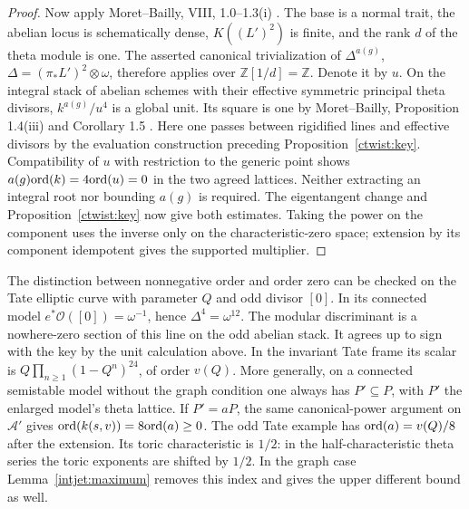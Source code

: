\begin{proof}
Now apply Moret--Bailly, VIII, 1.0--1.3(i)
\cite{moret-bailly-pinceaux}. The base is a normal trait, the
abelian locus is schematically dense, \(K((L')^2)\) is finite,
and the rank \(d\) of the theta module is one. The asserted
canonical trivialization of \(\Delta^{a(g)}\),
\(\Delta=(\pi_*L')^2\otimes\omega\), therefore applies over
\(\mathbb Z[1/d]=\mathbb Z\). Denote it by \(u\). On the integral
stack of abelian schemes with their effective symmetric principal
theta divisors, \(k^{a(g)}/u^4\) is a global unit. Its square is
one by Moret--Bailly, Proposition 1.4(iii) and Corollary 1.5
\cite{moret-bailly-key}. Here one passes between rigidified lines
and effective divisors by the evaluation construction preceding
Proposition~\ref{ctwist:key}. Compatibility of \(u\) with
restriction to the generic point shows
\(a(g){\rm ord}(k)=4{\rm ord}(u)=0\) in the two agreed lattices.
Neither extracting an integral root nor bounding \(a(g)\) is
required. The eigentangent change and Proposition~\ref{ctwist:key}
now give both estimates. Taking the power on the component uses
the inverse only on the characteristic-zero space; extension by
its component idempotent gives the supported multiplier.
\end{proof}

The distinction between nonnegative order and order zero can be
checked on the Tate elliptic curve with parameter \(Q\) and odd
divisor \([0]\). In its connected model
\(e^*\mathcal O([0])=\omega^{-1}\), hence
\(\Delta^4=\omega^{12}\). The modular discriminant is a
nowhere-zero section of this line on the odd abelian stack.
It agrees up to sign with the key by the unit calculation above.
In the invariant Tate frame its scalar is
\(Q\prod_{n\ge1}(1-Q^n)^{24}\), of order \(v(Q)\).
More generally, on a connected semistable model without the
graph condition one always has \(P'\subseteq P\), with \(P'\)
the enlarged model's theta lattice. If \(P'=aP\), the same
canonical-power argument on \(\mathcal A'\) gives
\({\rm ord}(k(s,v))=8{\rm ord}(a)\ge0\). The odd Tate example
has \({\rm ord}(a)=v(Q)/8\) after the extension. Its toric
characteristic is \(1/2\): in the half-characteristic theta
series the toric exponents are shifted by \(1/2\).
In the graph case Lemma~\ref{intjet:maximum} removes this
index and gives the upper different bound as well.

